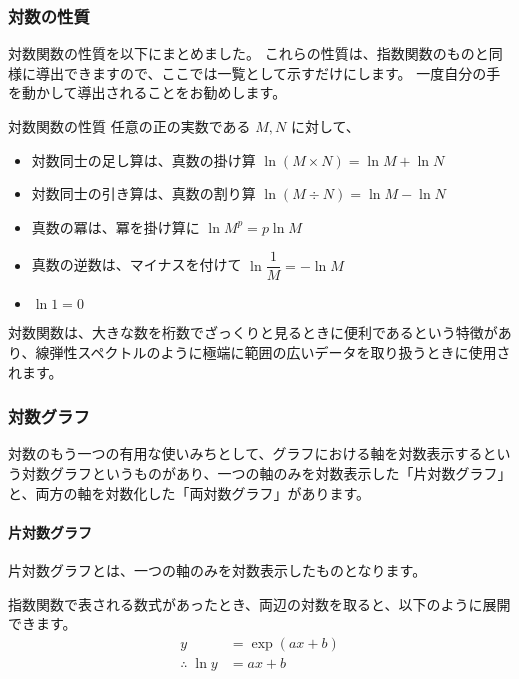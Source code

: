 \documentclass[uplatex,dvipdfmx,a4paper,11pt]{jsarticle}
\begin{document}
\subsubsection{対数の性質}
対数関数の性質を以下にまとめました。
これらの性質は、指数関数のものと同様に導出できますので、ここでは一覧として示すだけにします。
一度自分の手を動かして導出されることをお勧めします。
\large
\begin{itembox}[l]{対数関数の性質}
	任意の正の実数である $M,N$ に対して、
			\begin{itemize}
				\item 対数同士の足し算は、真数の掛け算 $\ln (M \times N) = \ln M + \ln N$
				\item 対数同士の引き算は、真数の割り算 $\ln(M \div N) = \ln M - \ln N$
				\item 真数の冪は、冪を掛け算に $\ln M^p = p \ln M$
				\item 真数の逆数は、マイナスを付けて $\ln \dfrac{1}{M} = -\ln M$
				\item $\ln 1 = 0$
			\end{itemize}
\end{itembox}
\normalsize
対数関数は、大きな数を桁数でざっくりと見るときに便利であるという特徴があり、線弾性スペクトルのように極端に範囲の広いデータを取り扱うときに使用されます。

\subsubsection{対数グラフ}
対数のもう一つの有用な使いみちとして、グラフにおける軸を対数表示するという対数グラフというものがあり、一つの軸のみを対数表示した「片対数グラフ」と、両方の軸を対数化した「両対数グラフ」があります。

\paragraph{片対数グラフ}
片対数グラフとは、一つの軸のみを対数表示したものとなります。

指数関数で表される数式があったとき、両辺の対数を取ると、以下のように展開できます。
\begin{align*}
	y&=\exp(ax+b) \\
	\therefore \; \ln y &= ax + b
\end{align*}
\end{document}
